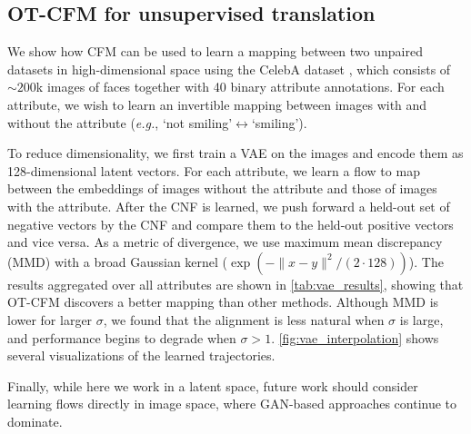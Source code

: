 \documentclass[10pt]{article}
\theoremstyle{plain}
\theoremstyle{definition}
\theoremstyle{remark}
\newcommand{\eg}{\textit{e.g.}}
\begin{document}
\subsection{OT-CFM for unsupervised translation}
\label{sec:exp_vae}

We show how CFM can be used to learn a mapping between two unpaired datasets in high-dimensional space using the CelebA dataset \citep{celeb,celeba}, which consists of $\sim200$k images of faces together with 40 binary attribute annotations. For each attribute, we wish to learn an invertible mapping between images with and without the attribute (\eg, `not smiling'$\leftrightarrow$`smiling').

To reduce dimensionality, we first train a VAE on the images and encode them as 128-dimensional latent vectors. For each attribute, we learn a flow to map between the embeddings of images without the attribute and those of images with the attribute. After the CNF is learned, we push forward a held-out set of negative vectors by the CNF and compare them to the held-out positive vectors and vice versa. As a metric of divergence, we use maximum mean discrepancy (MMD) with a broad Gaussian kernel ($\exp(-\|x-y\|^2/(2\cdot128))$). The results aggregated over all attributes are shown in \autoref{tab:vae_results}, showing that OT-CFM discovers a better mapping than other methods. Although MMD is lower for larger $\sigma$, we found that the alignment is less natural when $\sigma$ is large, and performance begins to degrade when $\sigma>1$. \autoref{fig:vae_interpolation} shows several visualizations of the learned trajectories.

Finally, while here we work in a latent space, future work should consider learning flows directly in image space, where GAN-based approaches \citep{cyclegan} continue to dominate. 

\begin{table}[t]
\centering
\begin{minipage}[c]{0.49\columnwidth}
\caption{MMD (in units of $10^{-3}$) between target and transformed source samples of CelebA latent vectors. Mean and standard deviation over 40 attributes and both translation directions ($-\leftrightarrow+$) for each attribute. `Identity' refers to performing no translation and treating source samples as approximate samples from the target.}\vspace*{-1em}
\label{tab:vae_results}
\end{minipage}\hfill
\begin{minipage}[c]{0.49\columnwidth}
\centering
{}
\end{minipage}
\end{table}
\end{document}
